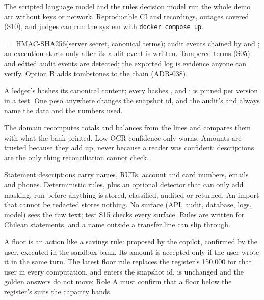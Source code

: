  The scripted language model and the rules decision model run the whole demo arc without keys or
network.
 Reproducible CI and recordings, outages covered (S10), and judges can run the system with
\texttt{docker compose up}.

  $=$ HMAC-SHA256(server secret, canonical terms); audit events chained by
 and ; an execution starts only after its audit event is written.
 Tampered terms (S05) and edited audit events are detected; the exported log is evidence anyone can
verify. Option B adds tombstones to the chain (ADR-038).

 A ledger's  hashes its canonical content; every  hashes
,  and ;  is pinned per version
in a test.
 One peso anywhere changes the snapshot id, and the audit's  and
 always name the data and the numbers used.

 The domain recomputes totals and balances from the lines and compares them with what the bank printed.
Low OCR confidence only warns.
 Amounts are trusted because they add up, never because a reader was confident; descriptions are the
only thing reconciliation cannot check.

 Statement descriptions carry names, RUTs, account and card numbers, emails and phones.
 Deterministic rules, plus an optional detector that can only add masking, run before anything is
stored, classified, audited or returned. An import that cannot be redacted stores nothing.
 No surface (API, audit, database, logs, model) sees the raw text; test S15 checks every surface.
Rules are written for Chilean statements, and a name outside a transfer line can slip through.

 A floor is an action like a savings rule: proposed by the copilot, confirmed by the user, executed in
the sandbox bank. Its amount is accepted only if the user wrote it in the same turn. The latest floor rule replaces the
register's 150{,}000 for that user in every computation, and enters the snapshot id.
  is unchanged and the golden answers do not move; Role A must confirm that a
floor below the register's suits the capacity bands.

